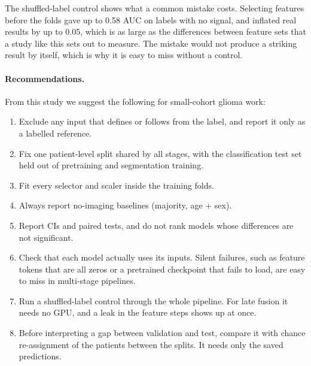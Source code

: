 \documentclass[11pt]{article}
\begin{document}
The shuffled-label control shows what a common mistake costs. Selecting features before the folds gave up to 0.58 AUC
on labels with no signal, and inflated real results by up to 0.05, which is as large as the differences between feature
sets that a study like this sets out to measure. The mistake would not produce a striking result by itself, which is why
it is easy to miss without a control.

\paragraph{Recommendations.} From this study we suggest the following for small-cohort glioma work:
\begin{enumerate}
  \item Exclude any input that defines or follows from the label, and report it only as a labelled reference.
  \item Fix one patient-level split shared by all stages, with the classification test set held out of pretraining
        and segmentation training.
  \item Fit every selector and scaler inside the training folds.
  \item Always report no-imaging baselines (majority, age + sex).
  \item Report CIs and paired tests, and do not rank models whose differences are not significant.
  \item Check that each model actually uses its inputs. Silent failures, such as feature tokens that are all zeros
        or a pretrained checkpoint that fails to load, are easy to miss in multi-stage pipelines.
  \item Run a shuffled-label control through the whole pipeline. For late fusion it needs no GPU, and a leak in the
        feature steps shows up at once.
  \item Before interpreting a gap between validation and test, compare it with chance re-assignment of the patients
        between the splits. It needs only the saved predictions.
\end{enumerate}
\end{document}
